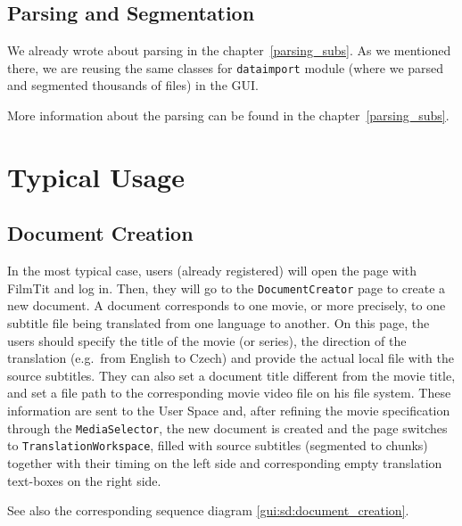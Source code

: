 \subsection{Parsing and Segmentation}
We already wrote about parsing in the chapter~\ref{parsing_subs}. As we mentioned there, we are reusing the same classes for {\tt dataimport} module (where we parsed and segmented thousands of files) in the GUI.

More information about the parsing can be found in the chapter~\ref{parsing_subs}.

\section{Typical Usage}

\subsection{Document Creation}

In the most typical case, users (already registered) will open the page with FilmTit and log in. Then, they will go to the {\tt DocumentCreator} page to create a new document. A document corresponds to one movie, or more precisely, to one subtitle file being translated from one language to another. On this page, the users should specify the title of the movie (or series), the direction of the translation (e.g.\ from English to Czech) and provide the actual local file with the source subtitles. They can also set a document title different from the movie title, and set a file path to the corresponding movie video file on his file system.
These information are sent to the User Space and, after refining the movie specification through the {\tt MediaSelector}, the new document is created and the page switches to {\tt TranslationWorkspace}, filled with source subtitles (segmented to chunks) together with their timing on the left side and corresponding empty translation text-boxes on the right side.

See also the corresponding sequence diagram \ref{gui:sd:document_creation}.

